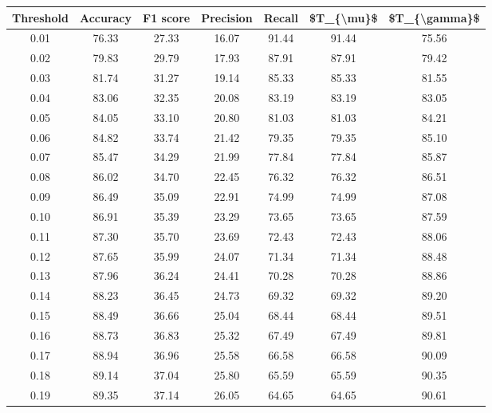 \begin{tabular}{|c|c|c|c|c|c|c|}
\hline
 Threshold &  Accuracy &  F1 score &  Precision &  Recall &  \$T\_\{\textbackslash mu\}\$ &  \$T\_\{\textbackslash gamma\}\$ \\
\hline
      0.01 &     76.33 &     27.33 &      16.07 &   91.44 &      91.44 &         75.56 \\
      0.02 &     79.83 &     29.79 &      17.93 &   87.91 &      87.91 &         79.42 \\
      0.03 &     81.74 &     31.27 &      19.14 &   85.33 &      85.33 &         81.55 \\
      0.04 &     83.06 &     32.35 &      20.08 &   83.19 &      83.19 &         83.05 \\
      0.05 &     84.05 &     33.10 &      20.80 &   81.03 &      81.03 &         84.21 \\
      0.06 &     84.82 &     33.74 &      21.42 &   79.35 &      79.35 &         85.10 \\
      0.07 &     85.47 &     34.29 &      21.99 &   77.84 &      77.84 &         85.87 \\
      0.08 &     86.02 &     34.70 &      22.45 &   76.32 &      76.32 &         86.51 \\
      0.09 &     86.49 &     35.09 &      22.91 &   74.99 &      74.99 &         87.08 \\
      0.10 &     86.91 &     35.39 &      23.29 &   73.65 &      73.65 &         87.59 \\
      0.11 &     87.30 &     35.70 &      23.69 &   72.43 &      72.43 &         88.06 \\
      0.12 &     87.65 &     35.99 &      24.07 &   71.34 &      71.34 &         88.48 \\
      0.13 &     87.96 &     36.24 &      24.41 &   70.28 &      70.28 &         88.86 \\
      0.14 &     88.23 &     36.45 &      24.73 &   69.32 &      69.32 &         89.20 \\
      0.15 &     88.49 &     36.66 &      25.04 &   68.44 &      68.44 &         89.51 \\
      0.16 &     88.73 &     36.83 &      25.32 &   67.49 &      67.49 &         89.81 \\
      0.17 &     88.94 &     36.96 &      25.58 &   66.58 &      66.58 &         90.09 \\
      0.18 &     89.14 &     37.04 &      25.80 &   65.59 &      65.59 &         90.35 \\
      0.19 &     89.35 &     37.14 &      26.05 &   64.65 &      64.65 &         90.61 \\

\end{tabular}
